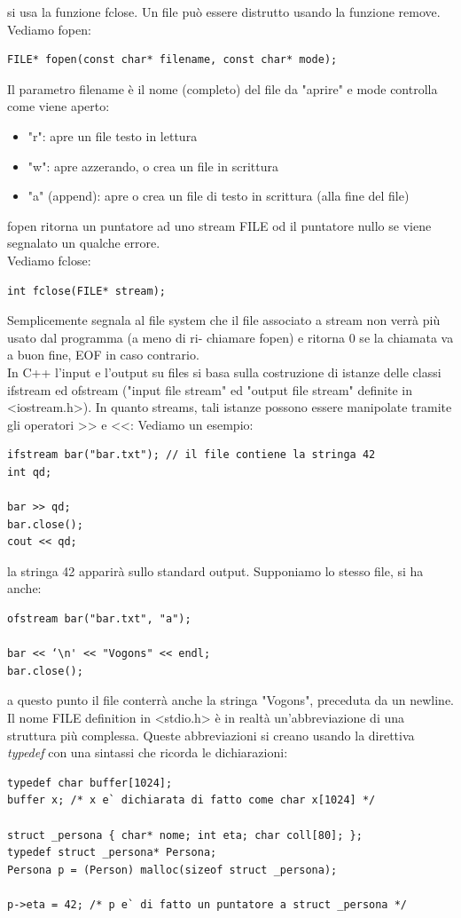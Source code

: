 \documentclass[a4paper,12pt, oneside]{book}
\begin{document}
si usa la funzione fclose. Un file può essere distrutto usando la funzione remove. \\
Vediamo fopen:
\begin{verbatim}
FILE* fopen(const char* filename, const char* mode);
\end{verbatim}
Il parametro filename è il nome (completo) del file da "aprire" e mode controlla come viene aperto:
\begin{itemize}
	\item "r": apre un file testo in lettura
	\item "w": apre azzerando, o crea un file in scrittura
	\item "a" (append): apre o crea un file di testo in scrittura (alla fine del file)
\end{itemize}
fopen ritorna un puntatore ad uno stream FILE od il puntatore
nullo se viene segnalato un qualche errore.
\\
Vediamo fclose:
\begin{verbatim}
int fclose(FILE* stream);
\end{verbatim}
Semplicemente segnala al file system che il file associato a
stream non verrà più usato dal programma (a meno di ri-
chiamare fopen) e ritorna 0 se la chiamata va a buon fine, EOF in caso contrario.\\
In C++ l'input e l'output su files si basa sulla costruzione di istanze delle classi ifstream ed ofstream ("input file stream" ed "output file stream" definite in <iostream.h>). In quanto streams, tali istanze possono essere manipolate
tramite gli operatori >> e <<: Vediamo un esempio:
\begin{verbatim}
ifstream bar("bar.txt"); // il file contiene la stringa 42
int qd;

bar >> qd;
bar.close();
cout << qd;
\end{verbatim}
la stringa 42 apparirà sullo standard output. Supponiamo lo stesso file, si ha anche:
\begin{verbatim}
ofstream bar("bar.txt", "a");

bar << ‘\n' << "Vogons" << endl;
bar.close();
\end{verbatim}
a questo punto il file conterrà anche la stringa "Vogons",
preceduta da un newline.\\
Il nome FILE definition in <stdio.h> è in realtà un'abbreviazione di una struttura più complessa.  Queste abbreviazioni si creano usando la direttiva \textit{typedef }con una
sintassi che ricorda le dichiarazioni:
\begin{verbatim}
typedef char buffer[1024];
buffer x; /* x e` dichiarata di fatto come char x[1024] */ 

struct _persona { char* nome; int eta; char coll[80]; };
typedef struct _persona* Persona;
Persona p = (Person) malloc(sizeof struct _persona); 

p->eta = 42; /* p e` di fatto un puntatore a struct _persona */
\end{verbatim}
\end{document}
